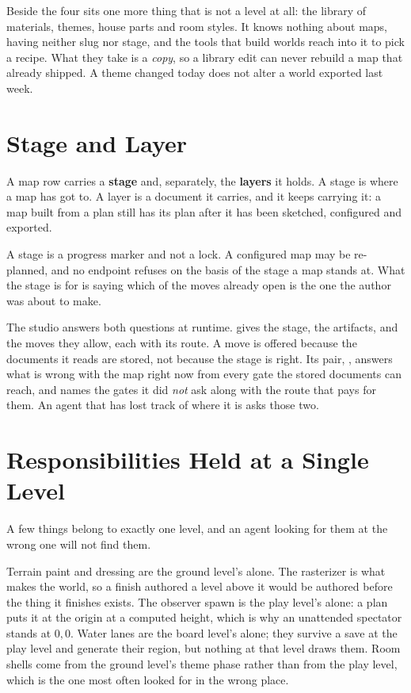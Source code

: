 Beside the four sits one more thing that is not a level at all: the library of
materials, themes, house parts and room styles. It knows nothing about maps, having
neither slug nor stage, and the tools that build worlds reach into it to pick a
recipe.
What they take is a \emph{copy}, so a library edit can never rebuild a map that
already shipped. A theme changed today does not alter a world exported last week.

\section{Stage and Layer}

A map row carries a \textbf{stage} and, separately, the \textbf{layers} it holds.
A stage is where a map has got to. A layer is a document it carries, and it keeps
carrying it: a map built from a plan still has its plan after it has been
sketched, configured and exported.

A stage is a progress marker and not a lock. A configured map may be re-planned,
and no endpoint refuses on the basis of the stage a map stands at. What the stage
is for is saying which of the moves already open is the one the author was about
to make.

The studio answers both questions at runtime.
 gives the stage, the artifacts, and the moves
they allow, each with its route. A move is offered because the documents it reads
are stored, not because the stage is right. Its pair,
, answers what is wrong with the map right
now from every gate the stored documents can reach, and names the gates it did
\emph{not} ask along with the route that pays for them. An agent that has lost
track of where it is asks those two.

\section{Responsibilities Held at a Single Level}

A few things belong to exactly one level, and an agent looking for them at the
wrong one will not find them.

Terrain paint and dressing are the ground level's alone. The rasterizer is what
makes the world, so a finish authored a level above it would be authored before
the thing it finishes exists. The observer spawn is the play level's alone: a plan
puts it at the origin at a computed height, which is why an unattended spectator
stands at $0,0$. Water lanes are the board level's alone; they survive a
save at the play level and generate their region, but nothing at that level draws
them. Room shells come from the ground level's theme phase rather than from the
play level, which is the one most often looked for in the wrong place.

